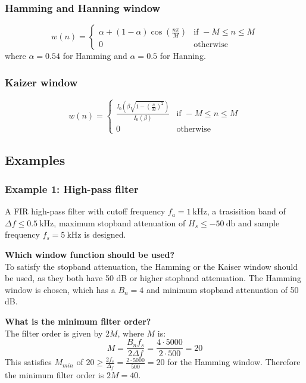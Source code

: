 \subsubsection{Hamming and Hanning window}
$$w(n)=\begin{cases}
\alpha+(1-\alpha)\cos\left(\frac{n\pi}{M}\right) & \text{if } -M\leq n\leq M\\
0 & \text{otherwise}
\end{cases}$$
where $\alpha=0.54$ for Hamming and $\alpha=0.5$ for Hanning.
\subsubsection{Kaizer window}
$$w(n)=\begin{cases}
  \frac{I_0\left(\beta\sqrt{1-\left(\frac{n}{M}\right)^{2}}\right)}{I_0(\beta)}& \text{if } -M\leq n\leq M\\
0 & \text{otherwise}
\end{cases}$$

\subsection{Examples}
\subsubsection{Example 1: High-pass filter}
A FIR high-pass filter with cutoff frequency $f_{a}=\SI{1}{\kilo\hertz}$, a trasisition band of $\Delta f\leq\SI{0.5}{\kilo\hertz}$, maximum stopband attenuation of $H_s\leq\SI{-50}{\decibel}$ and sample frequency $f_s=\SI{5}{\kilo\hertz}$ is designed.

\textbf{Which window function should be used?}\\
To satisfy the stopband attenuation, the Hamming or the Kaiser window should be used, as they both have 50 dB or higher stopband attenuation.
The Hamming window is chosen, which has a $B_n=4$ and minimum stopband attenuation of 50 dB.

\textbf{What is the minimum filter order?}\\
The filter order is given by $2M$, where $M$ is:
$$M=\frac{B_nf_s}{2\Delta f}=\frac{4\cdot5000}{2\cdot 500}=20$$
This satisfies $M_{min}$ of $20\geq\frac{2f_s}{\Delta_f}=\frac{2\cdot5000}{500}=20$ for the Hamming window.
Therefore the minimum filter order is $2M=40$.


